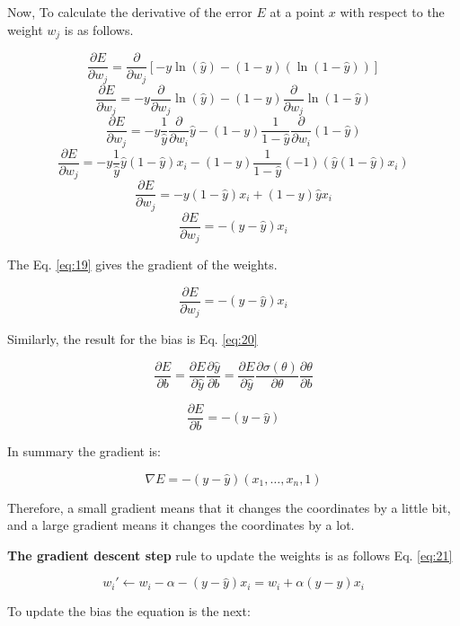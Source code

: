 \documentclass{article}
\begin{document}
Now, To calculate the derivative of the error \(E\) at a point \(x\) with respect to the weight \(w_j\) is as follows.

\[\frac{\partial E}{\partial w_j} = \frac{\partial}{\partial w_j} [-y\ln{(\hat{y})} - (1 - y) (\ln{(1 - \hat{y})})] \]
\[\frac{\partial E}{\partial w_j} = -y \frac{\partial}{\partial w_j} \ln{(\hat{y})} - (1 - y) \frac{\partial}{\partial w_j} \ln{(1 - \hat{y})} \]
\[\frac{\partial E}{\partial w_j} = -y \frac{1}{\hat{y}} \frac{\partial}{\partial w_i} \hat{y} - (1 - y) \frac{1}{1 - \hat{y}} \frac{\partial}{\partial w_i} (1 - \hat{y}) \]
\[\frac{\partial E}{\partial w_j} = -y \frac{1}{\hat{y}} \hat{y}(1 - \hat{y}) x_i - (1 - y) \frac{1}{1 - \hat{y}} (-1)(\hat{y}(1 - \hat{y}) x_i) \]
\[\frac{\partial E}{\partial w_j} = -y (1 - \hat{y}) x_i + (1 - y)\hat{y}x_i \]
\[\frac{\partial E}{\partial w_j} = -(y - \hat{y})x_i \]

The Eq. \eqref{eq:19} gives the gradient of the weights.

\begin{equation}
\label{eq:19}
\frac{\partial E}{\partial w_j} = -(y - \hat{y})x_i
\end{equation} 

Similarly, the result for the bias is Eq. \eqref{eq:20}

\[ \frac{\partial E}{\partial b} = \frac{\partial E}{\partial \hat{y}} \frac{\partial \hat{y}}{\partial b} =  \frac{\partial E}{\partial \hat{y}} \frac{\partial \sigma(\theta)}{\partial \theta} \frac{\partial \theta}{\partial b} \]

\begin{equation}
\label{eq:20}
\frac{\partial E}{\partial b} = -(y - \hat{y})
\end{equation} 

In summary the gradient is:

\[\nabla E = -(y - \hat{y})(x_1,\dots ,x_n,1)\]

Therefore, a small gradient means that it changes the coordinates by a little bit, and a large gradient means it changes the coordinates by a lot.

\textbf{The gradient descent step} rule to update the weights is as follows Eq. \eqref{eq:21}

\begin{equation}
\label{eq:21}
w_i' \leftarrow w_i - \alpha-(y - \hat{y})x_i = w_i + \alpha(y - \hat{y})x_i
\end{equation}

To update the bias the equation is the next:
\end{document}
